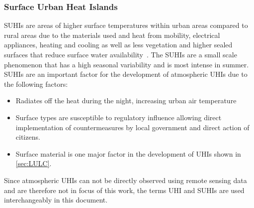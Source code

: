 \documentclass[12pt,a4paper, english,twoside]{scrartcl}
\begin{document}
    \subsubsection{Surface Urban Heat Islands}\label{sec:suhi}
       \glspl{SUHI} are areas of higher surface temperatures within urban areas compared to rural areas due to the materials used and heat from mobility, electrical appliances, heating and cooling as well as less vegetation and higher sealed surfaces that reduce surface water availability~\autocite[pp. 7--12]{EPA2008}. 
       The \glspl{SUHI} are a small scale phenomenon that has a high seasonal variability and is most intense in summer.
       \glspl{SUHI} are an important factor for the development of atmospheric \glspl{UHI} due to the following factors:
       \begin{itemize}
         \item Radiates off the heat during the night, increasing urban air temperature
         \item Surface types are susceptible to regulatory influence allowing direct implementation of countermeasures by local government and direct action of citizens.
         \item Surface material is one major factor in the development of \glspl{UHI} shown in \cref{sec:LULC}.
       \end{itemize}
       Since atmospheric \glspl{UHI} can not be directly observed using remote sensing data and are therefore not in focus of this work, the terms \gls{UHI} and \glspl{SUHI} are used interchangeably in this document. 
    \newpage
\end{document}
